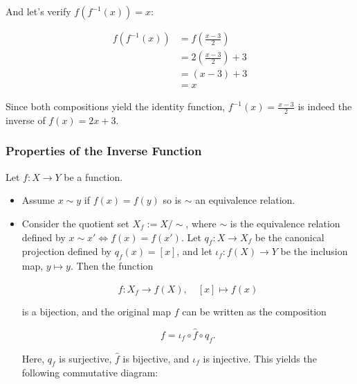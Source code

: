 And let's verify \(f(f^{-1}(x)) = x\):

\begin{align*}
	f(f^{-1}(x)) & = f\left(\frac{x - 3}{2}\right)     \\
	             & = 2\left(\frac{x - 3}{2}\right) + 3 \\
	             & = (x - 3) + 3                       \\
	             & = x
\end{align*}

Since both compositions yield the identity function, \(f^{-1} (x) = \frac{x - 3}{2}\) is indeed the 
inverse of \(f (x) = 2x + 3\).

\subsubsection{Properties of the Inverse Function}

Let \(f:X\to Y\) be a function.

\begin{itemize}

	\item Assume \(x \sim y \) if \(f(x)= f(y)\) so is \(\sim\) an equivalence relation.

	\item Consider the quotient set \( X_f := X/\sim \), where \( \sim \) is the equivalence relation 
	      defined by \( x \sim x' \iff f(x) = f(x') \). Let \( q_f : X \to X_f \) be the canonical 
		  projection defined by \( q_f(x) = [x] \), and let \( \iota_f : f(X) \to Y \) be the inclusion  
		  map, \( y \mapsto y \). Then the function
	      
		  \[
		      \hat{f} : X_f \to f(X), \quad [x] \mapsto f(x)
	      \]
	  
		  is a bijection, and the original map \( f \) can be written as the composition
	 
		  \[
		      f = \iota_f \circ \hat{f} \circ q_f.
	      \]
	 
		  Here, \( q_f \) is surjective, \( \hat{f} \) is bijective, and \( \iota_f \) is injective. 
		  This yields the following commutative diagram:
	      
		  \begin{center}
	      \end{center}

\end{itemize}

